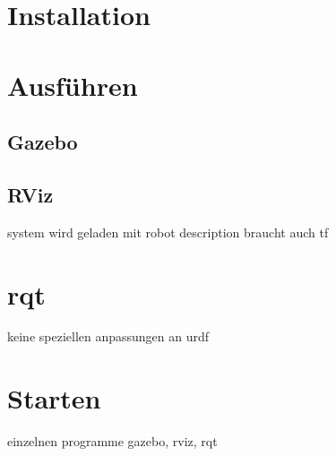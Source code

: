 \section{Installation}


\section{Ausführen}
\subsection{Gazebo}

\subsection{RViz}
system wird geladen mit robot description
braucht auch tf

\section{rqt}
keine speziellen anpassungen an urdf 

\section{Starten}
einzelnen programme gazebo, rviz, rqt


